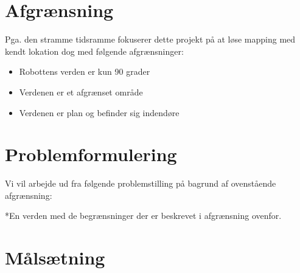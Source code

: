 \section*{Afgrænsning}
Pga. den stramme tidsramme fokuserer dette projekt på at løse mapping med kendt lokation dog med følgende afgrænsninger:
\begin{itemize}
\item Robottens verden er kun 90 grader
\item Verdenen er et afgrænset område
\item Verdenen er plan og befinder sig indendøre
\end{itemize}

\section*{Problemformulering}\label{problemformulering}
Vi vil arbejde ud fra følgende problemstilling på bagrund af ovenstående afgrænsning:

\begin{samepage}


\end{samepage}
*En verden med de begrænsninger der er beskrevet i afgrænsning ovenfor.

\section*{Målsætning}
